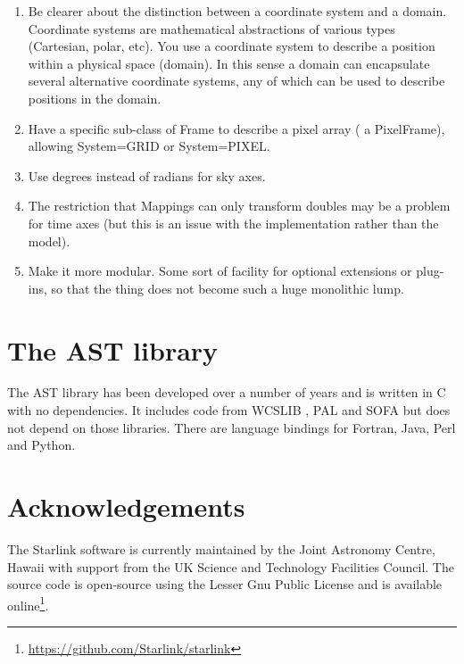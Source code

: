 \documentclass[final,authoryear,5p,times,twocolumn]{elsarticle}
\begin{document}
\begin{enumerate}

\item Be clearer about the distinction between a coordinate system and
  a domain. Coordinate systems are mathematical abstractions of
  various types (Cartesian, polar, etc). You use a coordinate system
  to describe a position within a physical space (domain). In this
  sense a domain can encapsulate several alternative coordinate
  systems, any of which can be used to describe positions in the
  domain.

\item Have a specific sub-class of Frame to describe a pixel array ( a
  PixelFrame), allowing System=GRID or System=PIXEL.

\item Use degrees instead of radians for sky axes.

\item The restriction that Mappings can only transform doubles may be
  a problem for time axes (but this is an issue with the
  implementation rather than the model).

\item Make it more modular. Some sort of facility for optional
  extensions or plug-ins, so that the thing does not become such a
  huge monolithic lump.

\end{enumerate}

\section{The AST library}

The AST library has been developed over a number of years
\citep{1998ASPC..145...41W,2000ASPC..216..506W,2001ASPC..238..129B,2004ASPC..314..412B,2008ASPC..394..635B,2010ASPC..434..213B,2012ASPC..461..825B}
  and is written in C with no dependencies. It includes code from
  WCSLIB \citep[][]{2006ASPC..351..591C}, PAL \citep{2013ASPC..475..307J}
  and SOFA \citep[][]{2011SchpJ...611404H} but does not depend on those
  libraries. There are language bindings for Fortran, Java, Perl and
  Python.

\section{Acknowledgements}

The Starlink software is currently maintained by the Joint Astronomy
Centre, Hawaii with support from the UK Science and Technology
Facilities Council. The source code is open-source using the Lesser
Gnu Public License and is available
online\footnote{\url{https://github.com/Starlink/starlink}}.
\end{document}

